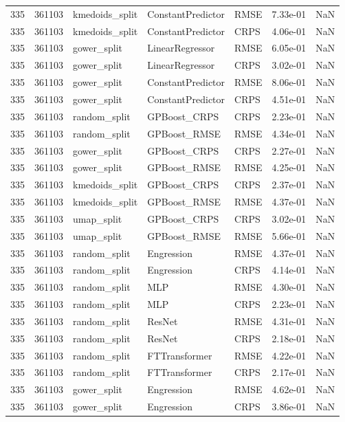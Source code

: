 \begin{tabular}{rrlllrr}
335 & 361103 & kmedoids\_split & ConstantPredictor & RMSE & 7.33e-01 & NaN \\
335 & 361103 & kmedoids\_split & ConstantPredictor & CRPS & 4.06e-01 & NaN \\
335 & 361103 & gower\_split & LinearRegressor & RMSE & 6.05e-01 & NaN \\
335 & 361103 & gower\_split & LinearRegressor & CRPS & 3.02e-01 & NaN \\
335 & 361103 & gower\_split & ConstantPredictor & RMSE & 8.06e-01 & NaN \\
335 & 361103 & gower\_split & ConstantPredictor & CRPS & 4.51e-01 & NaN \\
335 & 361103 & random\_split & GPBoost\_CRPS & CRPS & 2.23e-01 & NaN \\
335 & 361103 & random\_split & GPBoost\_RMSE & RMSE & 4.34e-01 & NaN \\
335 & 361103 & gower\_split & GPBoost\_CRPS & CRPS & 2.27e-01 & NaN \\
335 & 361103 & gower\_split & GPBoost\_RMSE & RMSE & 4.25e-01 & NaN \\
335 & 361103 & kmedoids\_split & GPBoost\_CRPS & CRPS & 2.37e-01 & NaN \\
335 & 361103 & kmedoids\_split & GPBoost\_RMSE & RMSE & 4.37e-01 & NaN \\
335 & 361103 & umap\_split & GPBoost\_CRPS & CRPS & 3.02e-01 & NaN \\
335 & 361103 & umap\_split & GPBoost\_RMSE & RMSE & 5.66e-01 & NaN \\
335 & 361103 & random\_split & Engression & RMSE & 4.37e-01 & NaN \\
335 & 361103 & random\_split & Engression & CRPS & 4.14e-01 & NaN \\
335 & 361103 & random\_split & MLP & RMSE & 4.30e-01 & NaN \\
335 & 361103 & random\_split & MLP & CRPS & 2.23e-01 & NaN \\
335 & 361103 & random\_split & ResNet & RMSE & 4.31e-01 & NaN \\
335 & 361103 & random\_split & ResNet & CRPS & 2.18e-01 & NaN \\
335 & 361103 & random\_split & FTTransformer & RMSE & 4.22e-01 & NaN \\
335 & 361103 & random\_split & FTTransformer & CRPS & 2.17e-01 & NaN \\
335 & 361103 & gower\_split & Engression & RMSE & 4.62e-01 & NaN \\
335 & 361103 & gower\_split & Engression & CRPS & 3.86e-01 & NaN \\

\end{tabular}
